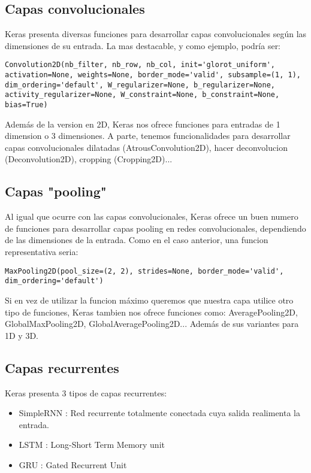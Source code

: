 \subsection{Capas convolucionales}
Keras presenta diversas funciones para desarrollar capas convolucionales según las dimensiones de su entrada. La mas destacable, y como ejemplo, podría ser:
\begin{verbatim}
Convolution2D(nb_filter, nb_row, nb_col, init='glorot_uniform', activation=None, weights=None, border_mode='valid', subsample=(1, 1), dim_ordering='default', W_regularizer=None, b_regularizer=None, activity_regularizer=None, W_constraint=None, b_constraint=None, bias=True)
\end{verbatim}
Además de la version en 2D, Keras nos ofrece funciones para entradas de 1 dimension o 3 dimensiones. A parte, tenemos funcionalidades para desarrollar capas convolucionales dilatadas (AtrousConvolution2D), hacer deconvolucion (Deconvolution2D), cropping (Cropping2D)...
\subsection{Capas "pooling"}
Al igual que ocurre con las capas convolucionales, Keras ofrece un buen numero de funciones para desarrollar capas pooling en redes convolucionales, dependiendo de las dimensiones de la entrada. Como en el caso anterior, una funcion representativa seria:
\begin{verbatim}
MaxPooling2D(pool_size=(2, 2), strides=None, border_mode='valid', dim_ordering='default')
\end{verbatim}
Si en vez de utilizar la funcion máximo queremos que nuestra capa utilice otro tipo de funciones, Keras tambien nos ofrece funciones como: AveragePooling2D, GlobalMaxPooling2D, GlobalAveragePooling2D... Además de sus variantes para 1D y 3D.
\subsection{Capas recurrentes}
Keras presenta 3 tipos de capas recurrentes:
\begin{itemize}[noitemsep]
\item SimpleRNN : Red recurrente totalmente conectada cuya salida realimenta la entrada.
\item LSTM : Long-Short Term Memory unit 
\item GRU : Gated Recurrent Unit
\end{itemize}

